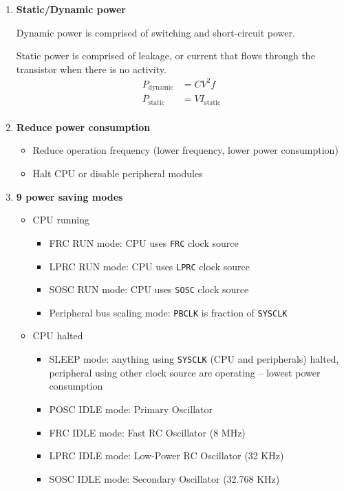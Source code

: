 \documentclass[a4paper]{article}
\begin{document}
  \begin{enumerate}[label = \arabic*.]
    \item \textbf{Static/Dynamic power}
      \par Dynamic power is comprised of switching and short-circuit power.
      \par Static power is comprised of leakage, or current that flows through the transistor when there is no activity.
      \begin{equation*}
        \begin{aligned}
          P_{\text{dynamic}} & = C V^2 f             \\
          P_{\text{static}}  & = V I_{\text{static}} \\
        \end{aligned}
      \end{equation*}

    \item \textbf{Reduce power consumption}
      \begin{itemize}[leftmargin = 1cm]
        \item Reduce operation frequency (lower frequency, lower power consumption)
        \item Halt CPU or disable peripheral modules
      \end{itemize}

    \item \textbf{9 power saving modes}
      \begin{itemize}[leftmargin = 1cm]
        \item CPU running
          \begin{itemize}[leftmargin = 1cm]
            \item FRC RUN mode: CPU uses \verb|FRC| clock source
            \item LPRC RUN mode: CPU uses \verb|LPRC| clock source
            \item SOSC RUN mode: CPU uses \verb|SOSC| clock source
            \item Peripheral bus scaling mode: \verb|PBCLK| is fraction of \verb|SYSCLK|
          \end{itemize}

        \item CPU halted
          \begin{itemize}[leftmargin = 1cm]
            \item SLEEP mode: anything using \verb|SYSCLK| (CPU and peripherals) halted, peripheral using other clock source are operating – lowest power consumption
            \item POSC IDLE mode: Primary Oscillator
            \item FRC IDLE mode: Fast RC Oscillator (8 MHz)
            \item LPRC IDLE mode: Low-Power RC Oscillator (32 KHz)
            \item SOSC IDLE mode: Secondary Oscillator (32.768 KHz)
          \end{itemize}
      \end{itemize}


\end{enumerate}
\end{document}
